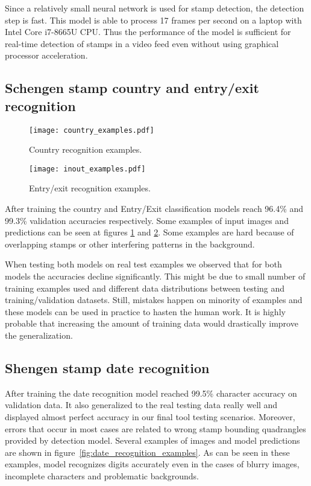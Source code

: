 \documentclass[twocolumn]{svjour3}
\begin{document}
Since a relatively small neural network is used for stamp detection, the detection step is fast. This model is able to process 17 frames per second on a laptop with Intel Core i7-8665U CPU. Thus the performance of the model is sufficient for real-time detection of stamps in a video feed even without using graphical processor acceleration.

\subsection{Schengen stamp country and entry/exit recognition}

\begin{figure}[tbp]
  \centering
  \texttt{[image: country\_examples.pdf]}
  \caption{Country recognition examples.}
  \label{fig:country_recognition_examples}
\end{figure}

\begin{figure}[tbp]
  \centering
  \texttt{[image: inout\_examples.pdf]}
  \caption{Entry/exit recognition examples.}
  \label{fig:inout_examples}
\end{figure}

After training the country and Entry/Exit classification models reach 96.4\% and 99.3\% validation accuracies respectively. Some examples of input images and predictions can be seen at figures \ref{fig:country_recognition_examples} and \ref{fig:inout_examples}. Some examples are hard because of overlapping stamps or other interfering patterns in the background.

When testing both models on real test examples we observed that for both models the accuracies decline significantly. This might be due to small number of training examples used and different data distributions between testing and training/validation datasets. Still, mistakes happen on minority of examples and these models can be used in practice to hasten the human work. It is highly probable that increasing the amount of training data would drastically improve the generalization.

\subsection{Shengen stamp date recognition}

After training the date recognition model reached 99.5\% character accuracy on validation data. It also generalized to the real testing data really well and displayed almost perfect accuracy in our final tool testing scenarios. Moreover, errors that occur in most cases are related to wrong stamp bounding quadrangles  provided by detection model. Several examples of images and model predictions are shown in figure~\ref{fig:date_recognition_examples}. As can be seen in these examples, model recognizes digits accurately even in the cases of blurry images, incomplete characters and problematic backgrounds.
\end{document}
